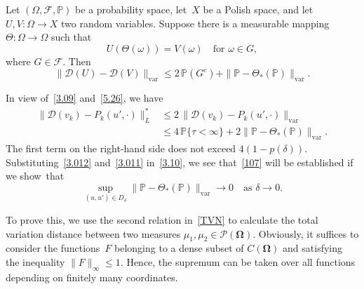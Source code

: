 \documentclass[JEP,XML,SOM,Unicode,ThmDefs]{cedram}
\let\mathcal\mathscr
\theoremstyle{plain}
\numberwithin{equation}{section}
\newcommand{\IP}{{\mathbb P}}
\newcommand{\OOmega}{{\boldsymbol\Omega}}
\newcommand{\DD}{{\mathcal D}}
\newcommand{\FF}{{\mathcal F}}
\newcommand{\PP}{{\mathcal P}}
\begin{document}
\begin{lemma} \label{l5.4}
Let $(\Omega,\FF,\IP)$ be a probability space, let~$X$ be a Polish space, and let~$U,V:\Omega\to X$ two random variables. Suppose there is a measurable mapping $\Theta:\Omega\to\Omega$ such that\vspace*{-3pt}
\begin{equation} \label{5.25}
U(\Theta(\omega))=V(\omega)\quad\text{for $\omega\in G$},
\end{equation}
where $G\in\FF$. Then\vspace*{-3pt}
\begin{equation} \label{5.26}
\|\DD(U)-\DD(V)\|_{\mathrm{var}}
\le 2\,\IP(G^c)+\|\IP-\Theta_*(\IP)\|_{\mathrm{var}}.
\end{equation}
\end{lemma}

In view of~\eqref{3.09} and~\eqref{5.26}, we have
\begin{equation}
\begin{aligned}
\|\DD(v_k)-P_k(u',\cdot)\|_L^*
&\le 2\,\|\DD(v_k)-P_k(u',\cdot)\|_{\mathrm{var}}\\
&\le 4\,\IP\{\tau<\infty\}+2\|\IP-\Theta_*(\IP)\|_{\mathrm{var}}.
\label{3.012}
\end{aligned}
\end{equation}
The first term on the right-hand side does not exceed $4(1-p(\delta))$. Substituting~\eqref{3.012} and~\eqref{3.011} in~\eqref{3.10}, we see that~\eqref{107} will be established if we show~that
\begin{equation} \label{1.15}
\sup_{(u,u')\in D_\delta}
\|\IP-\Theta_*(\IP)\|_{\mathrm{var}}\to0\quad\text{as $\delta\to0$}.
\end{equation}

To prove this, we use the second relation in~\eqref{TVN} to calculate the total variation distance between two measures $\mu_1,\mu_2\in\PP(\OOmega)$. Obviously, it suffices to consider the functions~$F$ belonging to a dense subset of $C(\OOmega)$ and satisfying the inequality $\|F\|_\infty\le 1$. Hence, the supremum can be taken over all functions depending on finitely many coordinates.
\end{document}
